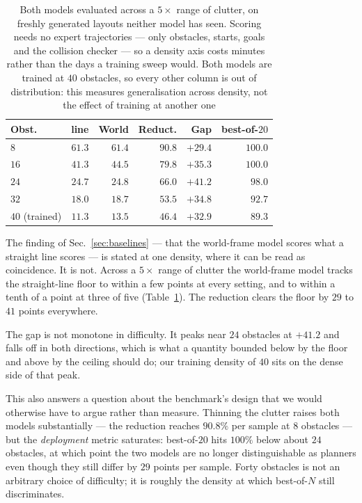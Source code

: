 \documentclass[10pt,twocolumn,letterpaper]{article}
\newcommand{\toprule}{\hline}
\newcommand{\midrule}{\hline}
\newcommand{\bottomrule}{\hline}
\theoremstyle{plain}
\begin{document}
\begin{table}[t]
\centering
\footnotesize
\setlength{\tabcolsep}{4pt}
\begin{tabular}{@{}l r r r r r@{}}
\toprule
Obst. & line & World & Reduct. & Gap & best-of-$20$ \\
\midrule
$8$            & $61.3$ & $61.4$ & $90.8$ & $+29.4$ & $100.0$ \\
$16$           & $41.3$ & $44.5$ & $79.8$ & $+35.3$ & $100.0$ \\
$24$           & $24.7$ & $24.8$ & $66.0$ & $\mathbf{+41.2}$ & $98.0$ \\
$32$           & $18.0$ & $18.7$ & $53.5$ & $+34.8$ & $92.7$ \\
$40$ (trained) & $11.3$ & $13.5$ & $46.4$ & $+32.9$ & $89.3$ \\
\bottomrule
\end{tabular}
\caption{Both models evaluated across a $5\times$ range of clutter, on freshly
generated layouts neither model has seen. Scoring needs no expert trajectories
--- only obstacles, starts, goals and the collision checker --- so a density axis
costs minutes rather than the days a training sweep would. Both models are trained
at $40$ obstacles, so every other column is out of distribution: this measures
generalisation across density, not the effect of training at another one}
\label{tab:density}
\end{table}

The finding of Sec.~\ref{sec:baselines} --- that the world-frame model scores what
a straight line scores --- is stated at one density, where it can be read as
coincidence. It is not. Across a $5\times$ range of clutter the world-frame model
tracks the straight-line floor to within a few points at every setting, and to
within a tenth of a point at three of five (Table~\ref{tab:density}). The
reduction clears the floor by $29$ to $41$ points everywhere.

The gap is not monotone in difficulty. It peaks near $24$ obstacles at $+41.2$
and falls off in both directions, which is what a quantity bounded below by the
floor and above by the ceiling should do; our training density of $40$ sits on
the dense side of that peak.

This also answers a question about the benchmark's design that we would otherwise
have to argue rather than measure. Thinning the clutter raises both models
substantially --- the reduction reaches $90.8\%$ per sample at $8$ obstacles ---
but the \emph{deployment} metric saturates: best-of-$20$ hits $100\%$ below about
$24$ obstacles, at which point the two models are no longer distinguishable as
planners even though they still differ by $29$ points per sample. Forty obstacles
is not an arbitrary choice of difficulty; it is roughly the density at which
best-of-$N$ still discriminates.
\end{document}
